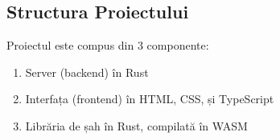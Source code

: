 \newpage
\begin{center}
	\section{Structura Proiectului}
\end{center}
\vspace{2cm}

Proiectul este compus din 3 componente:
\begin{enumerate}
	\item Server (backend) în Rust
	\item Interfața (frontend) în HTML, CSS, și TypeScript
	\item Librăria de șah în Rust, compilată în WASM
\end{enumerate}




